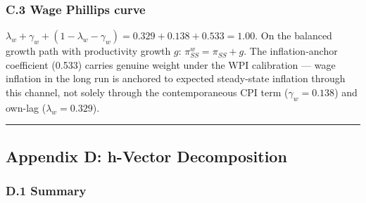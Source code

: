 \documentclass[
]{article}
\begin{document}
\subsubsection{C.3 Wage Phillips curve}\label{c.3-wage-phillips-curve}

\(\lambda_w + \gamma_w + (1-\lambda_w-\gamma_w) = 0.329 + 0.138 + 0.533 = 1.00\).
On the balanced growth path with productivity growth \(g\):
\(\pi^w_{SS} = \pi_{SS} + g\). The inflation-anchor coefficient (0.533)
carries genuine weight under the WPI calibration --- wage inflation in
the long run is anchored to expected steady-state inflation through this
channel, not solely through the contemporaneous CPI term
(\(\gamma_w = 0.138\)) and own-lag (\(\lambda_w = 0.329\)).

\begin{center}\rule{0.5\linewidth}{0.5pt}\end{center}

\subsection{Appendix D: h-Vector
Decomposition}\label{appendix-d-h-vector-decomposition}

\subsubsection{D.1 Summary}\label{d.1-summary}
\end{document}
